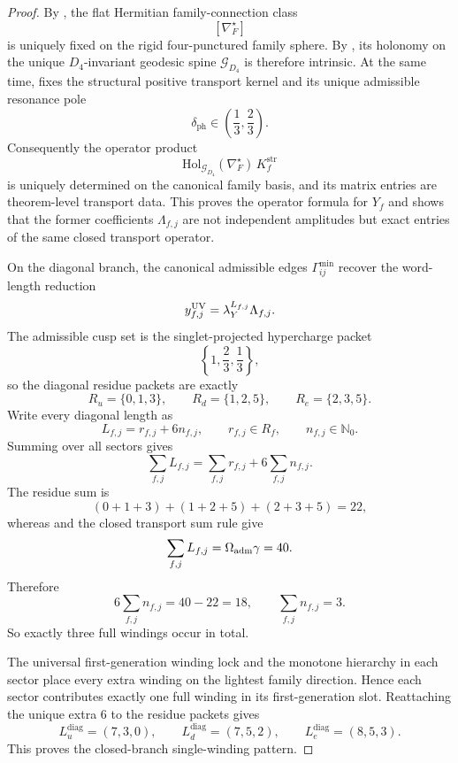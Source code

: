 \begin{proof}
By , the flat Hermitian family-connection class
\[
[\nabla_F^\star]
\]
is uniquely fixed on the rigid four-punctured family sphere. By
, its holonomy on the unique
$D_4$-invariant geodesic spine $\mathcal G_{D_4}$ is therefore intrinsic. At the same time,
 fixes the structural positive
transport kernel and its unique admissible resonance pole
\[
\delta_{\mathrm{ph}}\in\left(\frac13,\frac23\right).
\]
Consequently the operator product
\[
\mathrm{Hol}_{\mathcal G_{D_4}}(\nabla_F^\star)\,K_f^{\mathrm{str}}
\]
is uniquely determined on the canonical family basis, and its matrix entries are theorem-level
transport data. This proves the operator formula for $Y_f$ and shows that the former coefficients
$\Lambda_{f,j}$ are not independent amplitudes but exact entries of the same closed transport
operator.

On the diagonal branch, the canonical admissible edges $\Gamma_{ij}^{\min}$ recover the word-length
reduction
\[
y_{f,j}^{\mathrm{UV}}=\lambda_Y^{L_{f,j}}\Lambda_{f,j}.
\]
The admissible cusp set is the singlet-projected hypercharge packet
\[
\left\{1,\frac23,\frac13\right\},
\]
so the diagonal residue packets are exactly
\[
R_u=\{0,1,3\},
\qquad
R_d=\{1,2,5\},
\qquad
R_e=\{2,3,5\}.
\]
Write every diagonal length as
\[
L_{f,j}=r_{f,j}+6n_{f,j},
\qquad
r_{f,j}\in R_f,
\qquad
n_{f,j}\in\mathbb N_0.
\]
Summing over all sectors gives
\[
\sum_{f,j}L_{f,j}
=
\sum_{f,j}r_{f,j}+6\sum_{f,j}n_{f,j}.
\]
The residue sum is
\[
(0+1+3)+(1+2+5)+(2+3+5)=22,
\]
whereas  and the closed transport sum rule give
\[
\sum_{f,j}L_{f,j}=\Omega_{\mathrm{adm}}\gamma=40.
\]
Therefore
\[
6\sum_{f,j}n_{f,j}=40-22=18,
\qquad
\sum_{f,j}n_{f,j}=3.
\]
So exactly three full windings occur in total.

The universal first-generation winding lock and the monotone hierarchy in each sector place every
extra winding on the lightest family direction. Hence each sector contributes exactly one full
winding in its first-generation slot. Reattaching the unique extra $6$ to the residue packets gives
\[
L_u^{\mathrm{diag}}=(7,3,0),\qquad
L_d^{\mathrm{diag}}=(7,5,2),\qquad
L_e^{\mathrm{diag}}=(8,5,3).
\]
This proves the closed-branch single-winding pattern.
\end{proof}

